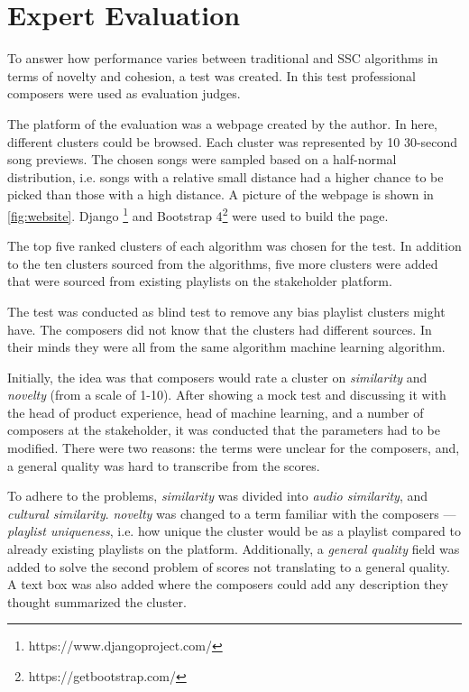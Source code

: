 \documentclass[../report.tex]{subfiles}
\begin{document}
\section{Expert Evaluation}
To answer how performance varies between traditional and SSC algorithms in terms of novelty and cohesion, a test was created. In this test professional composers were used as evaluation judges.

The platform of the evaluation was a webpage created by the author. In here, different clusters could be browsed. Each cluster was represented by 10 30-second song previews. The chosen songs were sampled based on a half-normal distribution, i.e. songs with a relative small distance had a higher chance to be picked than those with a high distance. A picture of the webpage is shown in \cref{fig:website}. Django \footnote{https://www.djangoproject.com/} and Bootstrap 4\footnote{https://getbootstrap.com/} were used to build the page.

The top five ranked clusters of each algorithm was chosen for the test. In addition to the ten clusters sourced from the algorithms, five more clusters were added that were sourced from existing playlists on the stakeholder platform.

The test was conducted as blind test to remove any bias playlist clusters might have. The composers did not know that the clusters had different sources. In their minds they were all from the same algorithm machine learning algorithm.

Initially, the idea was that composers would rate a cluster on \textit{similarity} and \textit{novelty} (from a scale of 1-10). After showing a mock test and discussing it with the head of product experience, head of machine learning, and a number of composers at the stakeholder, it was conducted that the parameters had to be modified. There were two reasons: the terms were unclear for the composers, and, a general quality was hard to transcribe from the scores.

To adhere to the problems, \textit{similarity} was divided into \textit{audio similarity}, and \textit{cultural similarity}. \textit{novelty} was changed to a term familiar with the composers --- \textit{playlist uniqueness}, i.e. how unique the cluster would be as a playlist compared to already existing playlists on the platform. Additionally, a \textit{general quality} field was added to solve the second problem of scores not translating to a general quality. A text box was also added where the composers could add any description they thought summarized the cluster.
\end{document}
